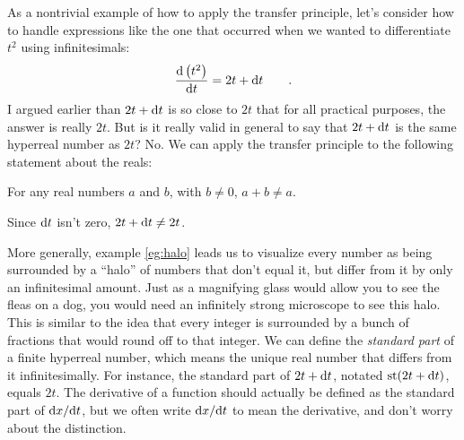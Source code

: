 \begin{eg}\label{eg:halo}
As a nontrivial example of how to apply the transfer principle, let's consider how to handle
expressions like the one that occurred when we wanted to differentiate $t^2$ using infinitesimals:
\begin{equation*}
  \frac{\textup{d} \left(t^2\right)}{\textup{d} t} = 2t+\textup{d} t  \qquad .
\end{equation*}
I argued earlier than $2t+\textup{d} t$ is so close to $2t$ that for all practical purposes, the
answer is really $2t$. But is it really valid in general to say that $2t+\textup{d} t$ is the
same hyperreal number as $2t$? No. We can apply the transfer principle to the
following statement about the reals:

\begin{indentedblock}
For any real numbers $a$ and $b$, with $b\ne 0$, $a+b\ne a$.
\end{indentedblock}

Since $\textup{d} t$ isn't zero, $2t+\textup{d} t\ne 2t$.
\end{eg}

More generally, example \ref{eg:halo} leads us to visualize every number as being surrounded by
a ``halo''
of numbers that don't equal it, but differ from it by only an infinitesimal amount.
Just as a magnifying glass would allow you to see the fleas on a dog, you would need an infinitely
strong microscope to see this halo. This is similar to the idea that every integer is surrounded by a bunch of fractions that
would round off to that integer. We can define the \emph{standard part} of a finite hyperreal
number, which means the unique real number that differs from it infinitesimally. For instance, the
standard part of $2t+\textup{d} t$, notated $\text{st}(2t+\textup{d} t)$, equals $2t$. The derivative of a function
should actually be defined as the standard part of $\textup{d} x/\textup{d} t$, but we often write $\textup{d} x/\textup{d} t$
to mean the derivative, and don't worry about the distinction.

